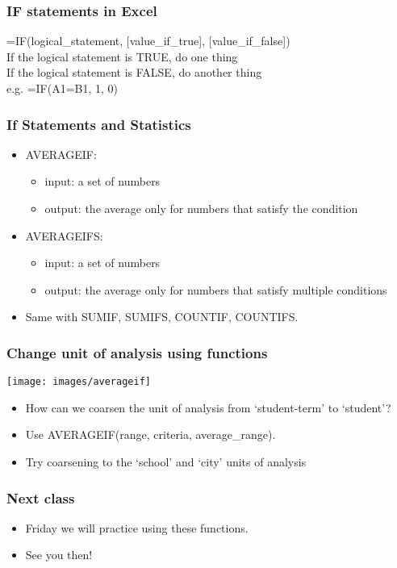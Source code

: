 \documentclass[11pt]{beamer}
\begin{document}
%

\begin{frame}
 \frametitle{IF statements in Excel}
=IF(logical\_statement, [value\_if\_true], [value\_if\_false]) \\
\bigskip
If the logical statement is TRUE, do one thing \\
If the logical statement is FALSE, do another thing \\
\bigskip
e.g. =IF(A1=B1, 1, 0)
\end{frame}

\begin{frame}
 \frametitle{If Statements and Statistics}
\begin{itemize}
\item \alert{AVERAGEIF}: 
\begin{itemize}
\item \alert{input}: a set of numbers
\item \alert{output}: the average \alert{only} for numbers that satisfy the condition
\end{itemize}\pause
\item \alert{AVERAGEIFS}: 
\begin{itemize}
\item \alert{input}: a set of numbers
\item \alert{output}: the average \alert{only} for numbers that satisfy \alert{multiple} conditions
\end{itemize}\pause
\item Same with \alert{SUMIF}, \alert{SUMIFS}, \alert{COUNTIF}, \alert{COUNTIFS}.
\end{itemize}
\end{frame}

\begin{frame}
\frametitle{Change unit of analysis using functions}
\begin{center}
	\texttt{[image: images/averageif]}
\end{center}
\begin{itemize}
	\item How can we coarsen the unit of analysis from `student-term' to `student'? \pause
	\item Use \alert{AVERAGEIF}(range, criteria, average\_range). \pause
	\item Try coarsening to the `school' and `city' units of analysis
\end{itemize}
\end{frame}

\begin{frame}
\frametitle{Next class}
\begin{itemize} \itemsep1em
\item[] Friday we will practice using these functions. 
\item[] See you then!
\end{itemize}
\end{frame}
\end{document}
